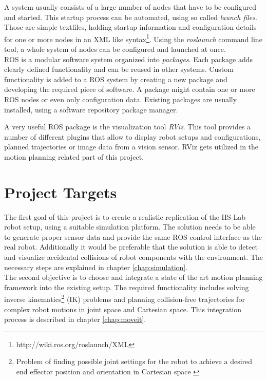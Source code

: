 A system usually consists of a large number of nodes that have to be configured and started. This startup process can be automated, using so called \emph{launch files}. Those are simple textfiles, holding startup information and configuration details for one or more nodes in an XML like syntax\footnote{http://wiki.ros.org/roslaunch/XML}. Using the \emph{roslaunch} command line tool, a whole system of nodes can be configured and launched at once. \\

ROS is a modular software system organized into \emph{packages}. Each package adds clearly defined functionality and can be reused in other systems. Custom functionality is added to a ROS system by creating a new package and developing the required piece of software. A package might contain one or more ROS nodes or even only configuration data. Existing packages are usually installed, using a software repository package manager.

A very useful ROS package is the visualization tool \emph{RViz}. This tool provides a number of different plugins that allow to display robot setups and configurations, planned trajectories or image data from a vision sensor. RViz gets utilized in the motion planning related part of this project.

\section{Project Targets}

The first goal of this project is to create a realistic replication of the IIS-Lab robot setup, using a suitable simulation platform. The solution needs to be able to generate proper sensor data and provide the same ROS control interface as the real robot. Additionally it would be preferable that the solution is able to detect and visualize accidental collisions of robot components with the environment. The necessary steps are explained in chapter \ref{chap:simulation}.\\

The second objective is to choose and integrate a state of the art motion planning framework into the existing setup. The required functionality includes solving inverse kinematics\footnote{Problem of finding possible joint settings for the robot to achieve a desired end effector position and orientation in Cartesian space \citep{craig2005}} (IK) problems and planning collision-free trajectories for complex robot motions in joint space and Cartesian space. This integration process is described in chapter \ref{chap:moveit}. \\

